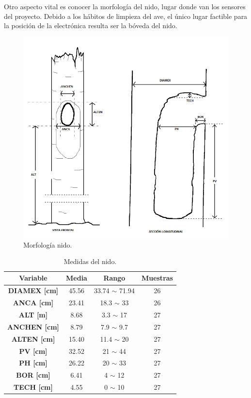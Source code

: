 Otro aspecto vital es conocer la morfología del nido, lugar donde van los sensores del proyecto. Debido a los hábitos de limpieza del ave, el único lugar factible para la posición de la electrónica resulta ser la bóveda del nido.
\begin{figure}[H]
	\centering
	\includegraphics[width=0.5\linewidth]{ImagenesIntroduccion/morfologia_nido}
	\caption{Morfología nido.}
	\label{fig:morfología_nido}
\end{figure}

\begin{table}[H]
\centering
\begin{tabular}{|c|c|c|c|}
\hline
\textbf{Variable}    & \textbf{Media} & \textbf{Rango}     & \textbf{Muestras} \\ \hline
\textbf{DIAMEX [cm]} & 45.56          & 33.74 $\sim$ 71.94 & 26                \\ \hline
\textbf{ANCA [cm]}   & 23.41          & 18.3 $\sim$ 33     & 26                \\ \hline
\textbf{ALT [m]}     & 8.68           & 3.3 $\sim$ 17      & 27                \\ \hline
\textbf{ANCHEN [cm]} & 8.79           & 7.9 $\sim$ 9.7     & 27                \\ \hline
\textbf{ALTEN [cm]}  & 15.40          & 11.4 $\sim$ 20     & 27                \\ \hline
\textbf{PV [cm]}     & 32.52          & 21 $\sim$ 44       & 27                \\ \hline
\textbf{PH [cm]}     & 26.22          & 20 $\sim$ 33       & 27                \\ \hline
\textbf{BOR [cm]}    & 6.41           & 4 $\sim$ 12        & 27                \\ \hline
\textbf{TECH [cm]}   & 4.55           & 0 $\sim$ 10        & 27                \\ \hline
\end{tabular}
\caption{Medidas del nido.}
\label{tab:medidasNido}
\end{table}

